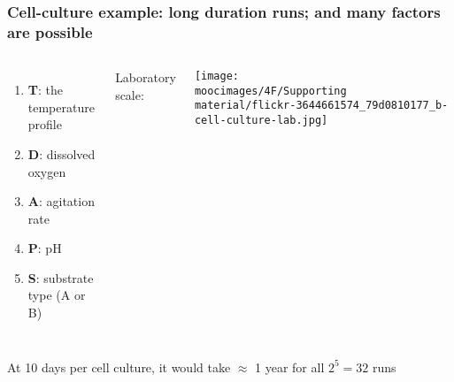 \documentclass[handout,11pt,aspectratio=169,mathserif]{beamer}
\begin{document}
\begin{frame}\frametitle{Cell-culture example: long duration runs; and many factors are possible}
	\begin{columns}[c]
			\begin{enumerate}
				\item	\textbf{T}: the temperature profile
				\item	\textbf{D}: dissolved oxygen
				\item	\textbf{A}: agitation rate
				\item	\textbf{P}: pH
				\item	\textbf{S}: substrate type (A or B)
			\end{enumerate}
		
			{\color{blue} \small Laboratory scale:} 
			
			\vspace{0.2cm}
			
			\centerline{\texttt{[image: \\moocimages/4F/Supporting material/flickr-3644661574\_79d0810177\_b-cell-culture-lab.jpg]}}
	\end{columns}

	\vfill
	At 10 days per cell culture, it would take $\approx$ 1 year for all $2^5 = 32$ runs
	
\end{frame}
\end{document}

